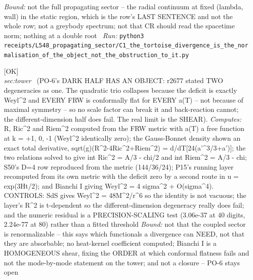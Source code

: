 \begin{description}
 \emph{Bound:} not the full propagating sector -- the radial continuum at fixed (lambda, wall) in the static region, which is the row's LAST SENTENCE and not the whole row; not a greybody spectrum; not that CR should read the spacetime norm; nothing at a double root
\ \emph{Run:} \texttt{python3 receipts/L548\_propagating\_sector/C1\_the\_tortoise\_divergence\_is\_the\_normalisation\_of\_the\_object\_not\_the\_obstruction\_to\_it.py}
\item[\label{rcpt:Q1_the_degeneracy_is_conformal_flatness_not_maximal_symmetry_so_no_scale_factor_can_break_it}\texttt{Q1\_the\_degeneracy\_is\_conformal\_flatness\_not\_maximal\_symmetry\_so\_no\_scale\_factor\_can\_break\_it}]\hfill\textsf{[OK]}\\
\textit{sec:tower} \ (PO-6's DARK HALF HAS AN OBJECT: r2677 stated TWO degeneracies as one. The quadratic trio collapses because the deficit is exactly Weyl\textasciicircum{}2 and EVERY FRW is conformally flat for EVERY a(T) -- not because of maximal symmetry -- so no scale factor can break it and back-reaction cannot; the different-dimension half does fail. The real limit is the SHEAR). 
\emph{Computes:} R, Ric\textasciicircum{}2 and Riem\textasciicircum{}2 computed from the FRW metric with a(T) a free function at k = +1, 0, -1 (Weyl\textasciicircum{}2 identically zero); the Gauss-Bonnet density shown an exact total derivative, sqrt(g)(R\textasciicircum{}2-4Ric\textasciicircum{}2+Riem\textasciicircum{}2) = d/dT[24(a'\textasciicircum{}3/3+a')]; the two relations solved to give int Ric\textasciicircum{}2 = A/3 - chi/2 and int Riem\textasciicircum{}2 = A/3 - chi; S50's D=4 row reproduced from the metric (144/36/24); P15's running layer recomputed from its own metric with the deficit zero by a second route in u = exp(3Ht/2); and Bianchi I giving Weyl\textasciicircum{}2 = 4 sigma\textasciicircum{}2 + O(sigma\textasciicircum{}4). CONTROLS: SdS gives Weyl\textasciicircum{}2 = 48M\textasciicircum{}2/r\textasciicircum{}6 so the identity is not vacuous; the layer's R\textasciicircum{}2 is t-dependent so the different-dimension degeneracy really does fail; and the numeric residual is a PRECISION-SCALING test (3.06e-37 at 40 digits, 2.24e-77 at 80) rather than a fitted threshold
 \emph{Bound:} not that the coupled sector is renormalizable -- this says which functionals a divergence can NEED, not that they are absorbable; no heat-kernel coefficient computed; Bianchi I is a HOMOGENEOUS shear, fixing the ORDER at which conformal flatness fails and not the mode-by-mode statement on the tower; and not a closure -- PO-6 stays open

\end{description}
